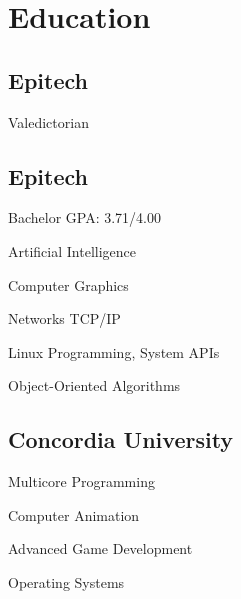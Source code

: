 \documentclass[
  english,
  a4paper
]{resume-openfont}
\begin{document}
\noindent%
\begin{minipage}[t]{0.31\textwidth}



\section{Education}

\subsection{Epitech}
\subtitle{Master in Computer Science}
Valedictorian
\sectionsep

\subsection{Epitech}
\subtitle{BS in Computer Science}
Bachelor GPA: 3.71/4.00
\vspace{0.8\topsep} %
\begin{coursework}
\item Artificial Intelligence
\item Computer Graphics
\item Networks TCP/IP
\item Linux Programming, System APIs
\item Object-Oriented Algorithms
\end{coursework}
\sectionsep

\subsection{Concordia University}
\subtitle{Visiting student in Computer Sciences, Graduate Level}
\begin{coursework}
\item Multicore Programming
\item Computer Animation
\item Advanced Game Development
\item Operating Systems
\end{coursework}



\end{minipage}
\end{document}
